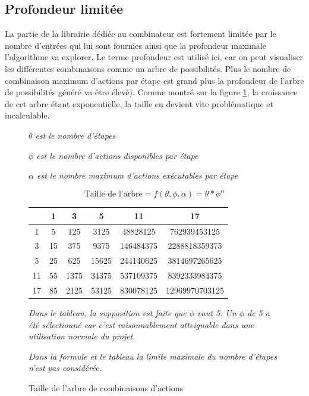 \documentclass[a4paper]{report}
\begin{document}
\subsection{Profondeur limitée}
La partie de la librairie dédiée au combinateur est fortement limitée par le nombre d'entrées qui lui sont fournies ainsi que la profondeur maximale l'algorithme va explorer.
Le terme profondeur est utilisé ici, car on peut visualiser les différentes combinaisons comme un arbre de possibilités.
Plus le nombre de combinaison maximum d'actions par étape est grand plus la profondeur de l'arbre de possibilités généré va être élevé).
Comme montré sur la figure \ref{fig:combinaisons_tree}, la croissance de cet arbre étant exponentielle, la taille en devient vite problématique et incalculable.

\begin{figure}[ht]
	\textit{$ \theta $ est le nombre d'étapes}
	
	\textit{$\phi$ est le nombre d'actions disponibles par étape}
	
	\textit{$\alpha$ est le nombre maximum d'actions exécutables par étape}
	
	$$ \text{Taille de l'arbre} = f(\theta, \phi, \alpha ) = \theta*\phi^{\alpha} $$
	
	\begin{center}
	\begin{tabular}{c||c|c|c|c|c}
	\hbox{\diagbox{$ \theta $}{$\alpha$}}
	 & 1 & 3 & 5 & 11 & 17\\ 
	\hline 
	\hline 
	1 & 5 & 125 & 3125 & 48828125 & 762939453125 \\
	\hline 
	3 & 15 & 375 & 9375 & 146484375 & 2288818359375 \\
	\hline 
	5 & 25 & 625 & 15625 & 244140625 & 3814697265625 \\
	\hline 
	11 & 55 & 1375 & 34375 & 537109375 & 8392333984375 \\
	\hline 
	17 & 85 & 2125 & 53125 & 830078125 & 12969970703125
	\end{tabular}
	\end{center}
	
	\textit{Dans le tableau, la supposition est faite que $ \phi $ vaut 5.
	Un $ \phi $ de 5 a été sélectionné car c'est raisonnablement atteignable dans une utilisation normale du projet.}
	
	\textit{Dans la formule et le tableau la limite maximale du nombre d'étapes n'est pas considérée.}
	\caption{Taille de l'arbre de combinaisons d'actions}
	
	\label{fig:combinaisons_tree}
\end{figure}
\end{document}
